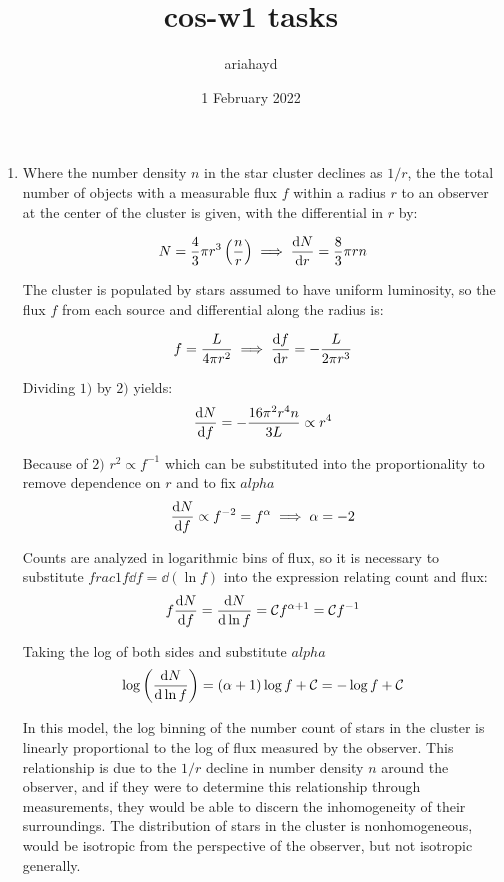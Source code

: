 \documentclass{paper}
\title{cos-w1 tasks}
\author{ariahayd}
\date{1 February 2022}
\begin{document}
 

\maketitle

\begin{enumerate}
    \item %
      Where the number density \(n\) in the star cluster declines as 
      \(1/r\), the the total number of objects with a measurable flux 
      \(f\) within a radius \(r\) to an observer at the center of the cluster 
      is given, with the differential in \(r\) by: 

      \begin{equation}
        N = \frac{4}{3} \pi r^3 \left( \frac{n}{r} \right) \implies 
        \dv{N}{r} = \frac{8}{3} \pi r n
      \end{equation}

      The cluster is populated by stars assumed to have uniform luminosity, 
      so the flux \(f\) from each source and differential along the radius is:

      \begin{equation}
        f = \frac{L}{4 \pi r^2} \implies \dv{f}{r} = -\frac{L}{2 \pi r^3}
      \end{equation}

      Dividing \(1)\) by \(2)\) yields:
      \[ \dv{N}{f} = -\frac{16 \pi^2 r^4 n }{3 L} \propto r^4 \]

      Because of \(2)\) \(r^2 \propto f^{-1}\) which can be substituted into 
      the proportionality to remove dependence on \(r\) and to fix \(alpha\)
      \[  \dv{N}{f} \propto f^{-2} = f^{\alpha} \implies \alpha = -2 \]

      Counts are analyzed in logarithmic bins of flux, so it is necessary to
      substitute \(frac{1}{f}\dd{f} = \dd{(\ln{f})}\) into the expression 
      relating count and flux:
      \[ f \dv{N}{f} = \dv{N}{\ln{f}}
      = \mathcal{C} f^{\alpha + 1} = \mathcal{C} f^{-1} \]

      Taking the log of both sides and substitute \(alpha\)
      \[ \log{\left(\dv{N}{\ln{f}}\right)} = (\alpha + 1)\log{f} + \mathcal{C}
      = -\log{f} + \mathcal{C} \]

      In this model, the log binning of the number count of stars in the
      cluster is linearly proportional to the log of flux measured by
      the observer. This relationship is due to the \(1/r\) decline in number
      density \(n\) around the observer, and if they were to determine this
      relationship through measurements, they would be able to discern the
      inhomogeneity of their surroundings. The distribution of stars in the
      cluster is nonhomogeneous, would be isotropic from the perspective of 
      the observer, but not isotropic generally.


\end{enumerate}
\end{document}
